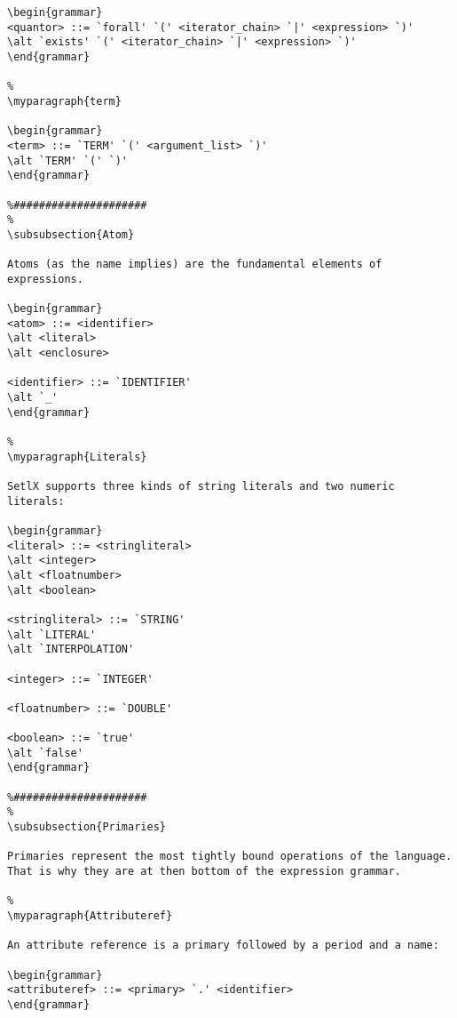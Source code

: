 \begin{verbatim}
\begin{grammar}
<quantor> ::= `forall' `(' <iterator_chain> `|' <expression> `)'
\alt `exists' `(' <iterator_chain> `|' <expression> `)'
\end{grammar}

%
\myparagraph{term}

\begin{grammar}
<term> ::= `TERM' `(' <argument_list> `)'
\alt `TERM' `(' `)'
\end{grammar}

%#####################
%
\subsubsection{Atom}

Atoms (as the name implies) are the fundamental elements of expressions.

\begin{grammar}
<atom> ::= <identifier>
\alt <literal>
\alt <enclosure>

<identifier> ::= `IDENTIFIER'
\alt `_'
\end{grammar}

%
\myparagraph{Literals}

SetlX supports three kinds of string literals and two numeric literals:

\begin{grammar}
<literal> ::= <stringliteral>
\alt <integer>
\alt <floatnumber>
\alt <boolean>

<stringliteral> ::= `STRING'
\alt `LITERAL'
\alt `INTERPOLATION'

<integer> ::= `INTEGER'

<floatnumber> ::= `DOUBLE'

<boolean> ::= `true'
\alt `false'
\end{grammar}

%#####################
%
\subsubsection{Primaries}

Primaries represent the most tightly bound operations of the language. That is why they are at then bottom of the expression grammar.

%
\myparagraph{Attributeref}

An attribute reference is a primary followed by a period and a name:

\begin{grammar}
<attributeref> ::= <primary> `.' <identifier>
\end{grammar}


\end{verbatim}
